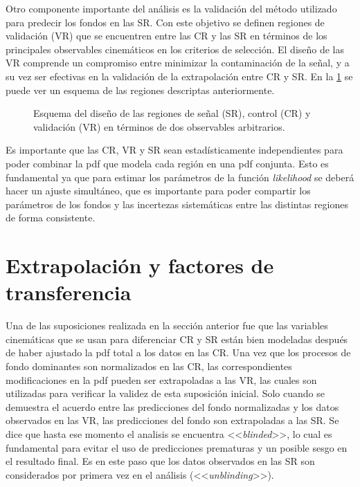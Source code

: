 Otro componente importante del análisis es la validación del método utilizado
para predecir los fondos en las SR. Con este objetivo se definen regiones de
validación (VR) que se encuentren entre las CR y las SR en términos de los
principales observables cinemáticos en los criterios de selección. El diseño de
las VR comprende un compromiso entre minimizar la contaminación de la señal, y a su
vez ser efectivas en la validación de la extrapolación entre CR y SR. En la
\cref{fig:regions_sketch} se puede ver un esquema de las regiones descriptas
anteriormente.

\begin{figure}[!htbp]
  \centering

  

  \caption{Esquema del diseño de las regiones de señal (SR), control (CR) y
    validación (VR) en términos de dos observables arbitrarios.}
  \label{fig:regions_sketch}
\end{figure}

Es importante que las CR, VR y SR sean estadísticamente independientes para
poder combinar la pdf que modela cada región en una pdf conjunta. Esto es
fundamental ya que para estimar los parámetros de la función \emph{likelihood} se deberá
hacer un ajuste simultáneo, que es importante para poder compartir los
parámetros de los fondos y las incertezas sistemáticas entre las distintas
regiones de forma consistente.


\section{Extrapolación y factores de transferencia}

Una de las suposiciones realizada en la sección anterior fue que las variables
cinemáticas que se usan para diferenciar CR y SR están bien modeladas después de
haber ajustado la pdf total a los datos en las CR. Una vez que los procesos de
fondo dominantes son normalizados en las CR, las correspondientes modificaciones
en la pdf pueden ser extrapoladas a las VR, las cuales son utilizadas para
verificar la validez de esta suposición inicial. Solo cuando se demuestra el
acuerdo entre las predicciones del fondo normalizadas y los datos observados en
las VR, las predicciones del fondo son extrapoladas a las SR.
Se dice que hasta ese momento el analisis se encuentra <<\emph{blinded}>>, lo cual es
fundamental para evitar el uso de predicciones prematuras y un posible sesgo en el
resultado final.
Es en este paso que los datos observados en las SR son considerados por primera
vez en el análisis (<<\emph{unblinding}>>).

